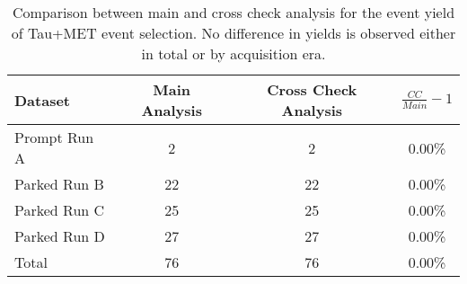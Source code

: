 \begin{table}[!htp]
\centering

\begin{tabular}{|l|c|c||c|}
  \hline
  Dataset & Main Analysis & Cross Check Analysis & $\frac{CC}{Main}-1$ \\ 
  \hline \hline
  Prompt Run A &  2 &  2 & 0.00\% \\
  Parked Run B & 22 & 22 & 0.00\% \\
  Parked Run C & 25 & 25 & 0.00\% \\
  Parked Run D & 27 & 27 & 0.00\% \\
  \hline \hline
  Total & 76 & 76 & 0.00\% \\
  \hline
\end{tabular}

\caption{Comparison between main and cross check analysis for the event yield of Tau+MET event selection. No difference in yields is observed either in total or by acquisition era.}
\end{table}